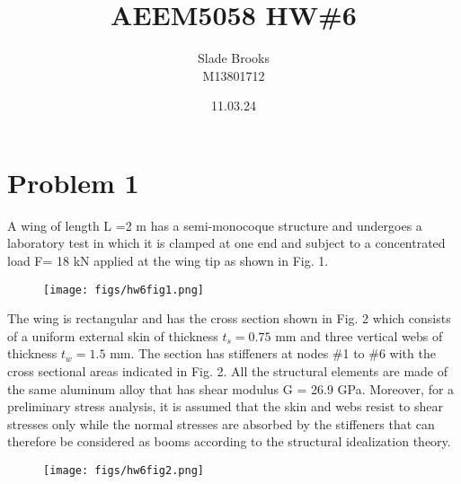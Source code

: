\documentclass[12 pt]{article}
\title{AEEM5058 HW\#6}
\date{11.03.24}
\author{Slade Brooks \\ M13801712}
\begin{document}
\maketitle

\section*{Problem 1}
A wing of length L =2 m has a semi-monocoque structure and undergoes a laboratory test in which
it is clamped at one end and subject to a concentrated load F= 18 kN applied at the wing tip as
shown in Fig. 1.
\begin{figure}[!hbtp]
    \centering
    \texttt{[image: figs/hw6fig1.png]}
\end{figure}
The wing is rectangular and has the cross section shown in Fig. 2 which consists of a uniform
external skin of thickness $t_s=0.75$ mm and three vertical webs of thickness $t_w = 1.5$ mm. The
section has stiffeners at nodes \#1 to \#6 with the cross sectional areas indicated in Fig. 2. All the
structural elements are made of the same aluminum alloy that has shear modulus G = 26.9 GPa.
Moreover, for a preliminary stress analysis, it is assumed that the skin and webs resist to shear
stresses only while the normal stresses are absorbed by the stiffeners that can therefore be
considered as booms according to the structural idealization theory.
\begin{figure}[H]
    \centering
    \texttt{[image: figs/hw6fig2.png]}
\end{figure}

\pagebreak
\end{document}
